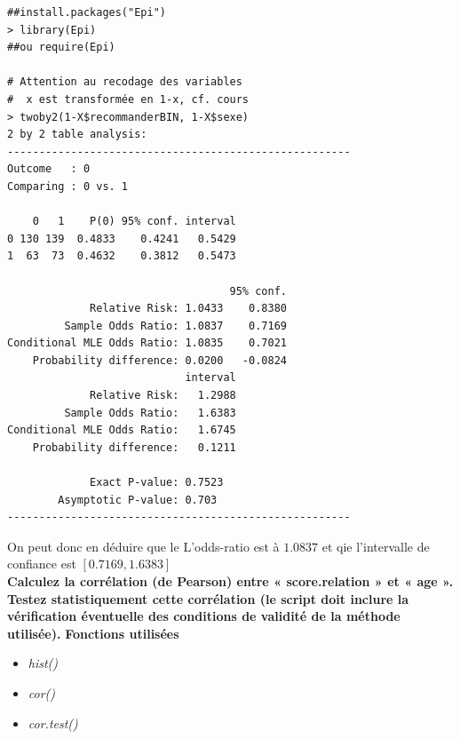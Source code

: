 \begin{lstlisting}[language=html]
##install.packages("Epi")
> library(Epi)
##ou require(Epi)

# Attention au recodage des variables 
#  x est transformée en 1-x, cf. cours
> twoby2(1-X$recommanderBIN, 1-X$sexe)
2 by 2 table analysis: 
------------------------------------------------------ 
Outcome   : 0 
Comparing : 0 vs. 1 

    0   1    P(0) 95% conf. interval
0 130 139  0.4833    0.4241   0.5429
1  63  73  0.4632    0.3812   0.5473

                                   95% conf.
             Relative Risk: 1.0433    0.8380
         Sample Odds Ratio: 1.0837    0.7169
Conditional MLE Odds Ratio: 1.0835    0.7021
    Probability difference: 0.0200   -0.0824
                            interval
             Relative Risk:   1.2988
         Sample Odds Ratio:   1.6383
Conditional MLE Odds Ratio:   1.6745
    Probability difference:   0.1211

             Exact P-value: 0.7523 
        Asymptotic P-value: 0.703 
------------------------------------------------------
\end{lstlisting}
On peut donc en déduire que le L'odds-ratio est à  $1.0837$ et qie l'intervalle de confiance est $[0.7169,1.6383]$\newline
\\
\textbf{Calculez la corrélation (de Pearson) entre « score.relation » et « age ». Testez statistiquement cette corrélation (le script doit inclure la vérification éventuelle des conditions de validité de la méthode utilisée).}\newline
\textbf{Fonctions utilisées}
\begin{itemize}
\item \textit{hist()}
\item \textit{cor()}
\item \textit{cor.test()}
\end{itemize}

